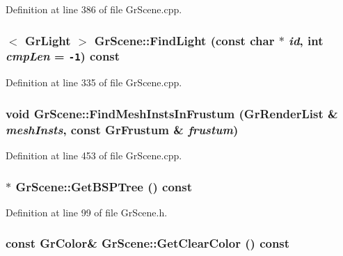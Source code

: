 Definition at line 386 of file GrScene.cpp.\hypertarget{class_gr_scene_72b23cf24995f4e8ed564694e47111e5}{
\subsubsection[{FindLight}]{$<$ {\bf GrLight} $>$ GrScene::FindLight (const char $\ast$ {\em id}, \/  int {\em cmpLen} = {\tt -1}) const}}
\label{class_gr_scene_72b23cf24995f4e8ed564694e47111e5}




Definition at line 335 of file GrScene.cpp.\hypertarget{class_gr_scene_5a2aeac93da5261846c53b92d7333025}{
\subsubsection[{FindMeshInstsInFrustum}]{\setlength{\rightskip}{0pt plus 5cm}void GrScene::FindMeshInstsInFrustum ({\bf GrRenderList} \& {\em meshInsts}, \/  const {\bf GrFrustum} \& {\em frustum})}}
\label{class_gr_scene_5a2aeac93da5261846c53b92d7333025}




Definition at line 453 of file GrScene.cpp.\hypertarget{class_gr_scene_0b35a3a91dac9b66a606cedb305e6e03}{
\subsubsection[{GetBSPTree}]{$\ast$ GrScene::GetBSPTree () const}}
\label{class_gr_scene_0b35a3a91dac9b66a606cedb305e6e03}




Definition at line 99 of file GrScene.h.\hypertarget{class_gr_scene_09f41cffdbef52b99439473e482faef8}{
\subsubsection[{GetClearColor}]{\setlength{\rightskip}{0pt plus 5cm}const {\bf GrColor}\& GrScene::GetClearColor () const}}
\label{class_gr_scene_09f41cffdbef52b99439473e482faef8}




